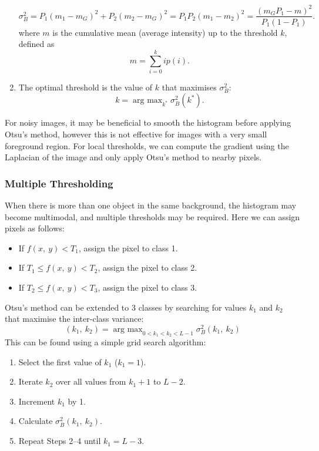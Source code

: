 \documentclass{article}
\DeclareMathOperator*{\argmax}{arg\ max}
\begin{document}
\begin{enumerate}
          \begin{equation*}
              \sigma_B^2 = P_1 \left( m_1 - m_G \right)^2 + P_2 \left( m_2 - m_G \right)^2 = P_1 P_2 \left( m_1 - m_2 \right)^2 = \frac{\left( m_G P_1 - m \right)^2}{P_1 \left( 1 - P_1 \right)}.
          \end{equation*}
          where \(m\) is the cumulative mean (average intensity) up to
          the threshold \(k\), defined as
          \begin{equation*}
              m = \sum_{i = 0}^k i p\left( i \right).
          \end{equation*}
    \item The optimal threshold is the value of \(k\) that maximises
          \(\sigma_B^2\):
          \begin{equation*}
              k = \argmax_{k^\ast} \sigma_B^2 \left( k^\ast \right).
          \end{equation*}
\end{enumerate}
For noisy images, it may be beneficial to smooth the histogram before
applying Otsu's method, however this is not effective for images with
a very small foreground region. For local thresholds, we can compute the
gradient using the Laplacian of the image and only apply Otsu's method
to nearby pixels.
\subsubsection{Multiple Thresholding}
When there is more than one object in the same background, the
histogram may become multimodal, and multiple thresholds may be
required. Here we can assign pixels as follows:
\begin{itemize}
    \item If \(f\left( x,\: y \right) < T_1\), assign the pixel to
          class 1.
    \item If \(T_1 \leq f\left( x,\: y \right) < T_2\), assign the
          pixel to class 2.
    \item If \(T_2 \leq f\left( x,\: y \right) < T_3\), assign the
          pixel to class 3.
\end{itemize}
Otsu's method can be extended to 3 classes by searching for values
\(k_1\) and \(k_2\) that maximise the inter-class variance:
\begin{equation*}
    \left( k_1,\: k_2 \right) = \argmax_{0 < k_1 < k_2 < L - 1} \sigma_B^2\left( k_1,\: k_2 \right)
\end{equation*}
This can be found using a simple grid search algorithm:
\begin{enumerate}
    \item Select the first value of \(k_1\) (\(k_1 = 1\)).
    \item Iterate \(k_2\) over all values from \(k_1 + 1\) to \(L -
          2\).
    \item Increment \(k_1\) by 1.
    \item Calculate \(\sigma_B^2\left( k_1,\: k_2 \right)\).
    \item Repeat Steps 2--4 until \(k_1 = L - 3\).
\end{enumerate}
\end{document}
